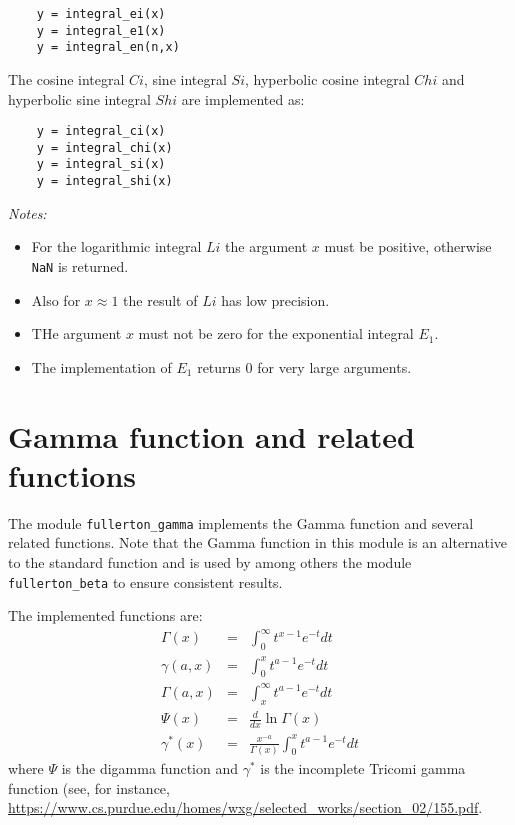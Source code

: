 \documentclass{article}
\begin{document}
\begin{verbatim}
    y = integral_ei(x)
    y = integral_e1(x)
    y = integral_en(n,x)
\end{verbatim}

The cosine integral $Ci$, sine integral $Si$, hyperbolic cosine integral $Chi$ and
hyperbolic sine integral $Shi$ are implemented as:

\begin{verbatim}
    y = integral_ci(x)
    y = integral_chi(x)
    y = integral_si(x)
    y = integral_shi(x)
\end{verbatim}

\emph{Notes:}
\begin{itemize}
\item
For the logarithmic integral $Li$ the argument $x$ must be positive, otherwise \verb+NaN+ is returned.
\item
Also for $x \approx 1$ the result of $Li$ has low precision.
\item
THe argument $x$ must not be zero for the exponential integral $E_1$.
\item
The implementation of $E_1$ returns 0 for very large arguments.
\end{itemize}


\section{Gamma function and related functions}
The module \verb+fullerton_gamma+ implements the Gamma function and several related functions. Note that
the Gamma function in this module is an alternative to the standard function and is used by among others the
module \verb+fullerton_beta+ to ensure consistent results.

The implemented functions are:
\begin{eqnarray}
    \Gamma(x)   &=& \int^\infty_0 t^{x-1} e^{-t} dt \\
    \gamma(a,x) &=& \int^x_0 t^{a-1} e^{-t} dt      \\
    \Gamma(a,x) &=& \int^\infty_x t^{a-1} e^{-t} dt \\
    \Psi(x)     &=& \frac{d}{dx} \ln \Gamma(x)      \\
    \gamma^*(x) &=& \frac{x^{-a}}{\Gamma(x)} \int^x_0 t^{a-1} e^{-t} dt
\end{eqnarray}
\noindent where $\Psi$ is the digamma function and $\gamma^*$ is the incomplete Tricomi gamma function (see, for instance,
\url{https://www.cs.purdue.edu/homes/wxg/selected_works/section_02/155.pdf}.
\end{document}
